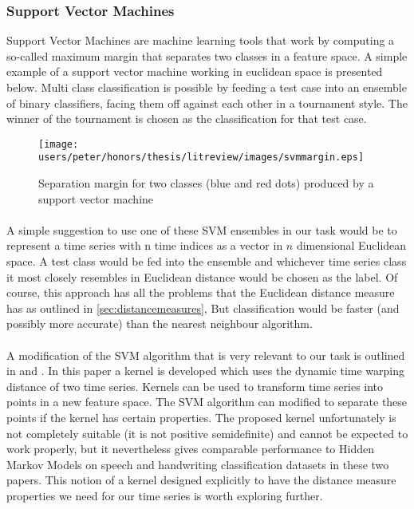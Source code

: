 	\subsubsection{Support Vector Machines}
	\label{sec:svms}
	Support Vector Machines are machine learning tools that work by computing a so-called maximum margin that separates two classes in a feature space. A simple example of a support vector machine working in euclidean space is presented below. Multi class classification is possible by feeding a test case into an ensemble of binary classifiers, facing them off against each other in a tournament style. The winner of the tournament is chosen as the classification for that test case.
	\begin{figure}[ht!]
	\centering
	\texttt{[image: users/peter/honors/thesis/litreview/images/svmmargin.eps]}
	\label{svmtrain}
	\caption{Separation margin for two classes (blue and red dots) produced  by a support vector machine}
	\end{figure}
	\paragraph{}
	A simple suggestion to use one of these SVM ensembles in our task would be to represent a time series with n time indices as a vector in $n$ dimensional Euclidean space. A test class would be fed into the ensemble and whichever time series class it most closely resembles in Euclidean distance would be chosen as the label. Of course, this approach has all the problems that the Euclidean distance measure has as outlined in \ref{sec:distancemeasures}, But classification would be faster (and possibly more accurate) than the nearest neighbour algorithm.
	\paragraph{}
	A modification of the SVM algorithm that is very relevant to our task is outlined in \citep{shimodaira2002dynamic} and \citep{bahlmann2002online}. In this paper a kernel is developed which uses the dynamic time warping distance of two time series. Kernels can be used to transform time series into points in a new feature space. The SVM algorithm can modified to separate these points if the kernel has certain properties. The proposed kernel unfortunately is not completely suitable (it is not positive semidefinite) and cannot be expected to work properly, but it nevertheless gives comparable performance to Hidden Markov Models on speech and handwriting classification datasets in these two papers. This notion of a kernel designed explicitly to have the distance measure properties we need for our time series is worth exploring further.
	
